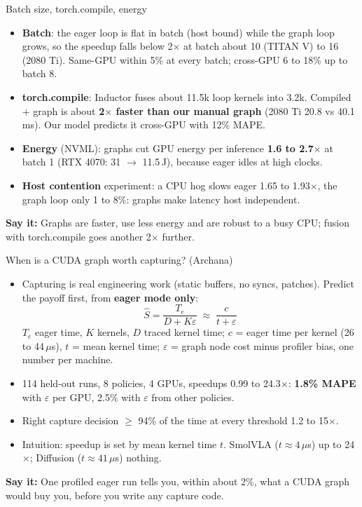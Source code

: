 \documentclass[aspectratio=169,10pt]{beamer}
\newcommand{\say}[1]{\par\vfill\noindent\colorbox{soft}{\parbox{\dimexpr\textwidth-2\fboxsep\relax}{\small\textbf{\textcolor{accent}{Say it:}} #1}}}
\begin{document}
\begin{frame}{Batch size, torch.compile, energy}
\begin{itemize}
\item \textbf{Batch}: the eager loop is flat in batch (host bound) while the graph loop grows,
  so the speedup falls below 2$\times$ at batch about 10 (TITAN V) to 16 (2080 Ti).
  Same-GPU within 5\% at every batch; cross-GPU 6 to 18\% up to batch 8.
\item \textbf{torch.compile}: Inductor fuses about 11.5k loop kernels into 3.2k. Compiled + graph
  is about \textbf{2$\times$ faster than our manual graph} (2080 Ti 20.8 vs 40.1\,ms).
  Our model predicts it cross-GPU with 12\% MAPE.
\item \textbf{Energy} (NVML): graphs cut GPU energy per inference \textbf{1.6 to 2.7$\times$} at
  batch 1 (RTX 4070: 31 $\rightarrow$ 11.5\,J), because eager idles at high clocks.
\item \textbf{Host contention} experiment: a CPU hog slows eager 1.65 to 1.93$\times$, the graph
  loop only 1 to 8\%: graphs make latency host independent.
\end{itemize}
\say{Graphs are faster, use less energy and are robust to a busy CPU; fusion with torch.compile
goes another 2$\times$ further.}
\end{frame}

\begin{frame}{When is a CUDA graph worth capturing? (Archana)}
\begin{itemize}
\item Capturing is real engineering work (static buffers, no syncs, patches). Predict the
  payoff first, from \textbf{eager mode only}:
\[\hat S = \frac{T_e}{D + K\varepsilon} \;\approx\; \frac{c}{t + \varepsilon}\]
  $T_e$ eager time, $K$ kernels, $D$ traced kernel time; $c$ = eager time per kernel (26 to
  44\,$\mu$s), $t$ = mean kernel time; $\varepsilon$ = graph node cost minus profiler bias, one
  number per machine.
\item 114 held-out runs, 8 policies, 4 GPUs, speedups 0.99 to 24.3$\times$:
  \textbf{1.8\% MAPE} with $\varepsilon$ per GPU, 2.5\% with $\varepsilon$ from other policies.
\item Right capture decision $\geq$ 94\% of the time at every threshold 1.2 to 15$\times$.
\item Intuition: speedup is set by mean kernel time $t$. SmolVLA ($t \approx 4\,\mu$s) up to
  24$\times$; Diffusion ($t \approx 41\,\mu$s) nothing.
\end{itemize}
\say{One profiled eager run tells you, within about 2\%, what a CUDA graph would buy you,
before you write any capture code.}
\end{frame}
\end{document}
